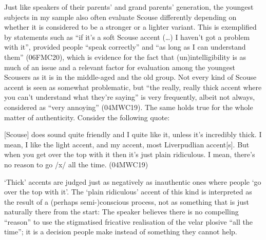 Just like speakers of their parents' and grand parents' generation, the youngest subjects in my sample also often evaluate Scouse differently depending on whether it is considered to be a stronger or a lighter variant.
This is exemplified by statements such as ``if it's a soft Scouse accent (\ldots) I haven't got a problem with it'', provided people ``speak correctly'' and ``as long as I can understand them'' (06FMC20), which is evidence for the fact that (un)intelligibility is as much of an issue and a relevant factor for evaluation among the youngest Scousers as it is in the middle-aged and the old group.
Not every kind of Scouse accent is seen as somewhat problematic, but ``the really, really thick accent where you can't understand what they're saying'' is very frequently, albeit not always, considered as ``very annoying'' (04MWC19).
The same holds true for the whole matter of authenticity.
Consider the following quote:
\begin{example}
	{}[Scouse] does sound quite friendly and I quite like it, unless it's incredibly thick.
	I mean, I like the light accent, and my accent, most Liverpudlian accent[s].
	But when you get over the top with it then it's just plain ridiculous.
	I mean, there's no reason to go /x/ all the time. (04MWC19)
\end{example}
`Thick' accents are judged just as negatively as inauthentic ones where people `go over the top with it'.
The `plain ridiculous' accent of this kind is interpreted as the result of a (perhaps semi-)conscious process, not as something that is just naturally there from the start: The speaker believes there is no compelling ``reason'' to use the stigmatised fricative realisation of the velar plosive ``all the time''; it is a decision people make instead of something they cannot help.

